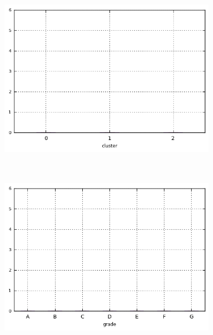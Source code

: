 \begin{anexosenv}
\begin{figure}[t!]
\begin{subfigure}[t]{0.45\textwidth}
            \centerline{\includegraphics[width=1.05\textwidth]{img/delinq_2yrs_by_cluster}}
        \end{subfigure}%
        ~ 
        \begin{subfigure}[t]{0.45\textwidth}
            \centering
   
            \centerline{\includegraphics[width=1.05\textwidth]{img/delinq_2yrs_by_grade}}

        \end{subfigure}
\\
                \caption{\emph{Boxplots} de recoveries}
        \begin{subfigure}[t]{0.45\textwidth}
            \centering


\end{subfigure}
\end{figure}
\end{anexosenv}
